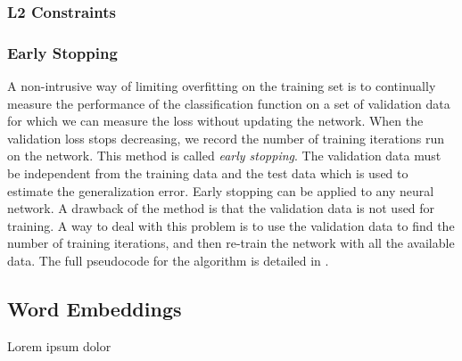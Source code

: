 \subsubsection{L2 Constraints}

\subsubsection{Early Stopping}

A non-intrusive way of limiting overfitting on the training set is to continually measure the performance of the classification function on a set of validation data for which we can measure the loss without updating the network. When the validation loss stops decreasing, we record the number of training iterations run on the network. This method is called \emph{early stopping}. The validation data must be independent from the training data and the test data which is used to estimate the generalization error. Early stopping can be applied to any neural network. A drawback of the method is that the validation data is not used for training. A way to deal with this problem is to use the validation data to find the number of training iterations, and then re-train the network with all the available data. The full pseudocode for the algorithm is detailed in \citep[p. 242]{dl_book}. 


\subsection{Word Embeddings}
\label{sec:word_embeddings}

Lorem ipsum dolor

